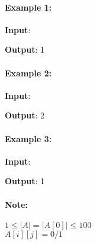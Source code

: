 \documentclass[a4paper,12pt]{article}
\begin{document}
\paragraph{Example 1:}
\begin{flushleft}
\textbf{Input}: 
\begin{figure}[H]
\end{figure}
\textbf{Output}: 1
\end{flushleft}
\paragraph{Example 2:}
\begin{flushleft}
\textbf{Input}:
\begin{figure}[H]
\end{figure}
\end{flushleft}
\textbf{Output}: 2
\paragraph{Example 3:}
\begin{flushleft}
\textbf{Input}:
\begin{figure}[H]
\end{figure}
\textbf{Output}: 1
\end{flushleft}
\paragraph{Note:}
\begin{flushleft}
$1\leq |A| = |A[0]| \leq 100$
\\
$A[i][j] = 0/1$
\end{flushleft}
\end{document}
